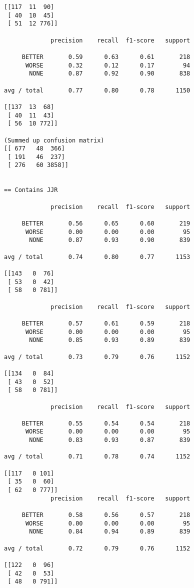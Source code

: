 \begin{appendices}
\begin{verbatim}
[[117  11  90]
 [ 40  10  45]
 [ 51  12 776]]
 
             precision    recall  f1-score   support

     BETTER       0.59      0.63      0.61       218
      WORSE       0.32      0.12      0.17        94
       NONE       0.87      0.92      0.90       838

avg / total       0.77      0.80      0.78      1150

[[137  13  68]
 [ 40  11  43]
 [ 56  10 772]]
 
(Summed up confusion matrix)
[[ 677   48  366]
 [ 191   46  237]
 [ 276   60 3858]]


== Contains JJR

             precision    recall  f1-score   support

     BETTER       0.56      0.65      0.60       219
      WORSE       0.00      0.00      0.00        95
       NONE       0.87      0.93      0.90       839

avg / total       0.74      0.80      0.77      1153

[[143   0  76]
 [ 53   0  42]
 [ 58   0 781]]
 
             precision    recall  f1-score   support

     BETTER       0.57      0.61      0.59       218
      WORSE       0.00      0.00      0.00        95
       NONE       0.85      0.93      0.89       839

avg / total       0.73      0.79      0.76      1152

[[134   0  84]
 [ 43   0  52]
 [ 58   0 781]]
 
             precision    recall  f1-score   support

     BETTER       0.55      0.54      0.54       218
      WORSE       0.00      0.00      0.00        95
       NONE       0.83      0.93      0.87       839

avg / total       0.71      0.78      0.74      1152

[[117   0 101]
 [ 35   0  60]
 [ 62   0 777]]
             precision    recall  f1-score   support

     BETTER       0.58      0.56      0.57       218
      WORSE       0.00      0.00      0.00        95
       NONE       0.84      0.94      0.89       839

avg / total       0.72      0.79      0.76      1152

[[122   0  96]
 [ 42   0  53]
 [ 48   0 791]]
 

\end{verbatim}
\end{appendices}
